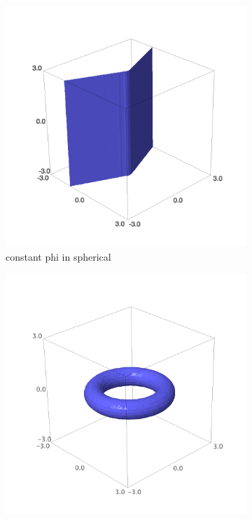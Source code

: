 \documentclass{article}
\begin{document}
\begin{figure}
    \centering
    \begin{subfigure}[b]{0.3\textwidth}
        \includegraphics[width=\textwidth]{images/spherical_phi.png}
        \caption{constant phi in spherical}
    \end{subfigure}
    \begin{subfigure}[b]{0.3\textwidth}
        \includegraphics[width=\textwidth]{images/toroidal_tau.png}

\end{subfigure}
\end{figure}
\end{document}
